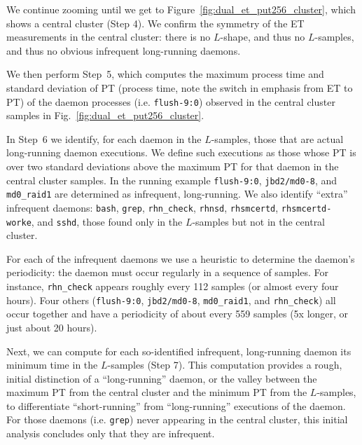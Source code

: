 \documentclass[letter]{ieice}
\begin{document}
{We continue zooming until we get to Figure~\ref{fig:dual_et_put256_cluster},
which shows a central cluster (Step 4). 
We confirm the symmetry of the ET measurements in the central cluster: there
is no $L$-shape, and thus no $L$-samples, and thus no obvious infrequent
long-running daemons.

We then perform Step~5, which computes 
the maximum process time and standard deviation 
of PT (process time, note the switch in emphasis from ET to PT) of the daemon processes
(i.e. {\tt flush-9:0}) 
observed in the central cluster samples in Fig.~\ref{fig:dual_et_put256_cluster}. 

In Step~6 we identify, for each daemon in the \hbox{$L$-samples}, 
those that are actual long-running daemon
executions.  We define such executions as those whose PT 
is over two standard deviations above the maximum PT for
that daemon in the central cluster samples. 
In the running example  {\tt flush-9:0}, 
{\tt jbd2/md0-8}, and {\tt md0\_raid1} 
are determined as infrequent, \hbox{long-running}.
We also identify ``extra'' infrequent daemons: 
{\tt bash}, {\tt grep}, {\tt rhn\_check}, {\tt rhnsd}, {\tt rhsmcertd}, 
{\tt rhsmcertd-worke}, and {\tt sshd}, those 
found only in the $L$-samples but not in the central cluster. 

For each of the infrequent daemons 
we use a heuristic to determine the daemon's periodicity:
the daemon must occur regularly in a sequence of samples.
For instance, {\tt rhn\_check} appears 
roughly every 112 samples (or almost every four hours). 
Four others ({\tt flush-9:0}, {\tt jbd2/md0-8}, {\tt md0\_raid1}, and {\tt rhn\_check}) 
all occur together and have a periodicity of about every 559 samples 
(5x longer, or just about 20 hours). 

Next, we can compute for each so-identified infrequent, long-running daemon its
minimum time in the \hbox{$L$-samples} (Step 7). 
This computation provides a rough, initial distinction of a ``long-running''
daemon, or the valley between the maximum PT from the central cluster 
and the minimum PT from the $L$-samples, to differentiate ``short-running'' 
from ``\hbox{long-running}'' executions of the daemon. 
For those daemons (i.e. {\tt grep}) never appearing in the central cluster,
this initial \hbox{analysis} concludes only that they are infrequent.

}
\end{document}
